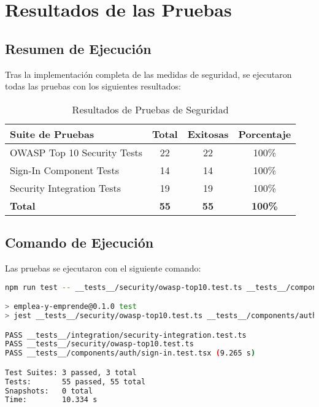 \documentclass[12pt,a4paper]{article}
\begin{document}
\section{Resultados de las Pruebas}

\subsection{Resumen de Ejecución}

Tras la implementación completa de las medidas de seguridad, se ejecutaron todas las pruebas con los siguientes resultados:

\begin{table}[H]
\centering
\begin{tabularx}{\textwidth}{|X|c|c|c|}
\hline
\textbf{Suite de Pruebas} & \textbf{Total} & \textbf{Exitosas} & \textbf{Porcentaje} \\
\hline
OWASP Top 10 Security Tests & 22 & 22 & 100\% \\
\hline
Sign-In Component Tests & 14 & 14 & 100\% \\
\hline
Security Integration Tests & 19 & 19 & 100\% \\
\hline
\textbf{Total} & \textbf{55} & \textbf{55} & \textbf{100\%} \\
\hline
\end{tabularx}
\caption{Resultados de Pruebas de Seguridad}
\end{table}

\subsection{Comando de Ejecución}

Las pruebas se ejecutaron con el siguiente comando:

\begin{lstlisting}[language=bash, caption=Ejecución de Pruebas de Seguridad]
npm run test -- __tests__/security/owasp-top10.test.ts __tests__/components/auth/sign-in.test.tsx __tests__/integration/security-integration.test.ts

> emplea-y-emprende@0.1.0 test
> jest __tests__/security/owasp-top10.test.ts __tests__/components/auth/sign-in.test.tsx __tests__/integration/security-integration.test.ts

PASS __tests__/integration/security-integration.test.ts
PASS __tests__/security/owasp-top10.test.ts
PASS __tests__/components/auth/sign-in.test.tsx (9.265 s)

Test Suites: 3 passed, 3 total
Tests:       55 passed, 55 total
Snapshots:   0 total
Time:        10.334 s
\end{lstlisting}
\end{document}
